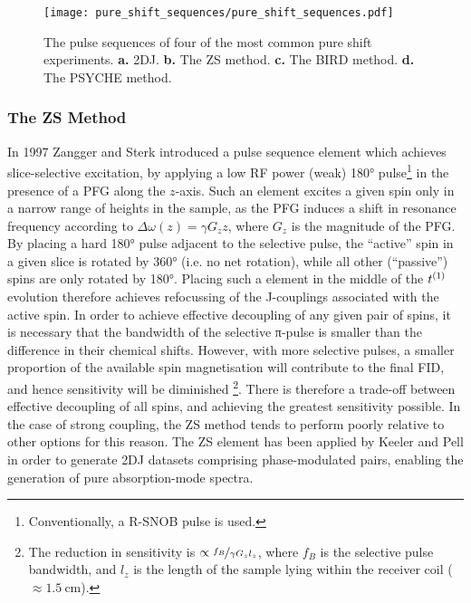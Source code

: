 \begin{figure}
    \centering
    \texttt{[image: pure\_shift\_sequences/pure\_shift\_sequences.pdf]}
    \caption{
        The pulse sequences of four of the most common pure shift experiments.
        \textbf{a.} \acs{2DJ}.
        \textbf{b.} The \acs{ZS} method.
        \textbf{c.} The \acs{BIRD} method.
        \textbf{d.} The \acs{PSYCHE} method.
    }
    \label{fig:pure_shift_seqs}
\end{figure}

\subsubsection{The \acl{ZS} Method}
\label{subsec:ZS}
In 1997 Zangger and Sterk introduced a pulse sequence element which achieves
slice-selective excitation, by applying a low \ac{RF} power (weak) \ang{180}
pulse\footnote{Conventionally, a R-SNOB pulse is used\cite{Kupce1995}.} in the
presence of a \ac{PFG} along the $z$-axis\cite{Zangger1997}. Such an element
excites a
given spin only in a narrow range of heights in the sample, as the \ac{PFG}
induces a shift in resonance frequency according to $\Delta \omega(z) = \gamma
G_z z$, where $G_z$ is the magnitude of the \ac{PFG}. By placing a hard
\ang{180} pulse adjacent to the selective pulse, the
``active'' spin in a given slice is rotated by \ang{360} (i.e. no net
rotation), while all other (``passive'') spins are only rotated by \ang{180}.
Placing such a element in the middle of the $t^{(1)}$ evolution therefore
achieves refocussing of the J-couplings associated with the active
spin\cite{Aguilar2010}. In order to achieve effective decoupling of any given
pair of spins, it is necessary that the bandwidth of the selective π-pulse is
smaller than the difference in their chemical shifts. However, with more
selective pulses, a smaller proportion of the available spin magnetisation will
contribute to the final FID, and hence sensitivity will be diminished
\footnote{
    The reduction in sensitivity is $\propto \nicefrac{f_B}{\gamma G_z l_z}$,
    where $f_B$ is the selective pulse bandwidth, and $l_z$ is the length of
    the sample lying within the receiver coil ($\approx
    \qty{1.5}{\centi\meter}$).
}.
There is therefore a trade-off between effective decoupling of all spins, and
achieving the greatest sensitivity possible. In the case of strong coupling,
the \ac{ZS} method tends to perform poorly relative to other options for this
reason. The \ac{ZS} element has been applied by Keeler and Pell in order to
generate \ac{2DJ} datasets comprising phase-modulated pairs, enabling the
generation of pure absorption-mode spectra\cite{Pell2007}.


